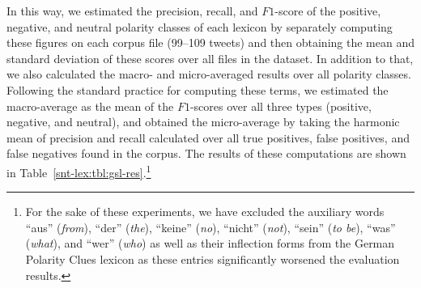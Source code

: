 In this way, we estimated the precision, recall, and $F1$-score of the
positive, negative, and neutral polarity classes of each lexicon by
separately computing these figures on each corpus file (99--109
tweets) and then obtaining the mean and standard deviation of these
scores over all files in the dataset.  In addition to that, we also
calculated the macro- and micro-averaged results over all polarity
classes.  Following the standard practice for computing these terms,
we estimated the macro-average as the mean of the $F1$-scores over all
three types (positive, negative, and neutral), and obtained the
micro-average by taking the harmonic mean of precision and recall
calculated over all true positives, false positives, and false
negatives found in the corpus.  The results of these computations are
shown in Table~\ref{snt-lex:tbl:gsl-res}.\footnote{For the sake of
  these experiments, we have excluded the auxiliary words ``aus''
  (\emph{from}), ``der'' (\emph{the}), ``keine'' (\emph{no}),
  ``nicht'' (\emph{not}), ``sein'' (\emph{to be}), ``was''
  (\emph{what}), and ``wer'' (\emph{who}) as well as their inflection
  forms from the German Polarity Clues lexicon as these entries
  significantly worsened the evaluation results.}

